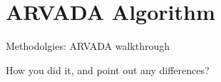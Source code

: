 \chapter{ARVADA Algorithm}

Methodolgies:
ARVADA walkthrough

How you did it, and point out any differences?